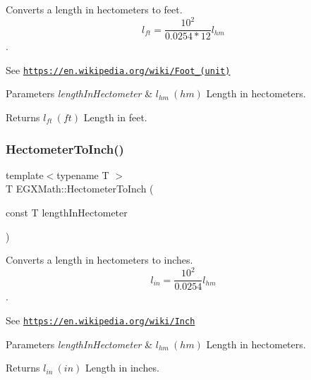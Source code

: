 Converts a length in hectometers to feet. \[ l_{ft}= \frac{10^{2}}{0.0254 * 12} l_{hm} \]. 

See \href{https://en.wikipedia.org/wiki/Foot_(unit)}{\tt https\+://en.\+wikipedia.\+org/wiki/\+Foot\+\_\+(unit)} 
\begin{DoxyParams}{Parameters}
{\em length\+In\+Hectometer} & $ l_{hm}\ (hm)$ Length in hectometers. \\
\hline
\end{DoxyParams}
\begin{DoxyReturn}{Returns}
$ l_{ft}\ (ft)$ Length in feet. 
\end{DoxyReturn}
\mbox{\label{group___e_g_x_math-_conversions-_length_conversions-_s_i-_hectometer-_imperial_ga21fd4a7228c229b0b229fd0fab224998}} 
\subsubsection{\texorpdfstring{Hectometer\+To\+Inch()}{HectometerToInch()}}
{\footnotesize\ttfamily template$<$typename T $>$ \\
T E\+G\+X\+Math\+::\+Hectometer\+To\+Inch (\begin{DoxyParamCaption}\item[{const T}]{length\+In\+Hectometer }\end{DoxyParamCaption})}



Converts a length in hectometers to inches. \[ l_{in}= \frac{10^{2}}{0.0254} l_{hm} \]. 

See \href{https://en.wikipedia.org/wiki/Inch}{\tt https\+://en.\+wikipedia.\+org/wiki/\+Inch} 
\begin{DoxyParams}{Parameters}
{\em length\+In\+Hectometer} & $ l_{hm}\ (hm)$ Length in hectometers. \\
\hline
\end{DoxyParams}
\begin{DoxyReturn}{Returns}
$ l_{in}\ (in)$ Length in inches. 
\end{DoxyReturn}
\mbox{\label{group___e_g_x_math-_conversions-_length_conversions-_s_i-_hectometer-_imperial_ga117bf04e7f132a33598fa098a8b7c17e}} 

